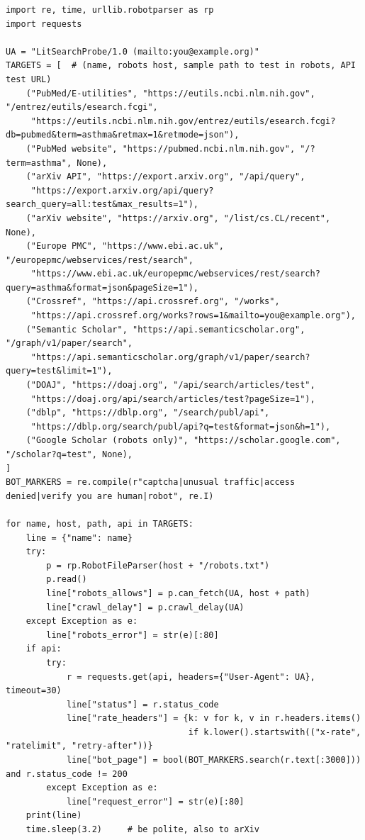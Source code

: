 \documentclass[11pt,a4paper]{article}
\begin{document}
\begin{lstlisting}[caption={probe\_access.py: проверка robots.txt и один безопасный запрос к каждому API}]
import re, time, urllib.robotparser as rp
import requests

UA = "LitSearchProbe/1.0 (mailto:you@example.org)"
TARGETS = [  # (name, robots host, sample path to test in robots, API test URL)
    ("PubMed/E-utilities", "https://eutils.ncbi.nlm.nih.gov", "/entrez/eutils/esearch.fcgi",
     "https://eutils.ncbi.nlm.nih.gov/entrez/eutils/esearch.fcgi?db=pubmed&term=asthma&retmax=1&retmode=json"),
    ("PubMed website", "https://pubmed.ncbi.nlm.nih.gov", "/?term=asthma", None),
    ("arXiv API", "https://export.arxiv.org", "/api/query",
     "https://export.arxiv.org/api/query?search_query=all:test&max_results=1"),
    ("arXiv website", "https://arxiv.org", "/list/cs.CL/recent", None),
    ("Europe PMC", "https://www.ebi.ac.uk", "/europepmc/webservices/rest/search",
     "https://www.ebi.ac.uk/europepmc/webservices/rest/search?query=asthma&format=json&pageSize=1"),
    ("Crossref", "https://api.crossref.org", "/works",
     "https://api.crossref.org/works?rows=1&mailto=you@example.org"),
    ("Semantic Scholar", "https://api.semanticscholar.org", "/graph/v1/paper/search",
     "https://api.semanticscholar.org/graph/v1/paper/search?query=test&limit=1"),
    ("DOAJ", "https://doaj.org", "/api/search/articles/test",
     "https://doaj.org/api/search/articles/test?pageSize=1"),
    ("dblp", "https://dblp.org", "/search/publ/api",
     "https://dblp.org/search/publ/api?q=test&format=json&h=1"),
    ("Google Scholar (robots only)", "https://scholar.google.com", "/scholar?q=test", None),
]
BOT_MARKERS = re.compile(r"captcha|unusual traffic|access denied|verify you are human|robot", re.I)

for name, host, path, api in TARGETS:
    line = {"name": name}
    try:
        p = rp.RobotFileParser(host + "/robots.txt")
        p.read()
        line["robots_allows"] = p.can_fetch(UA, host + path)
        line["crawl_delay"] = p.crawl_delay(UA)
    except Exception as e:
        line["robots_error"] = str(e)[:80]
    if api:
        try:
            r = requests.get(api, headers={"User-Agent": UA}, timeout=30)
            line["status"] = r.status_code
            line["rate_headers"] = {k: v for k, v in r.headers.items()
                                    if k.lower().startswith(("x-rate", "ratelimit", "retry-after"))}
            line["bot_page"] = bool(BOT_MARKERS.search(r.text[:3000])) and r.status_code != 200
        except Exception as e:
            line["request_error"] = str(e)[:80]
    print(line)
    time.sleep(3.2)     # be polite, also to arXiv
\end{lstlisting}
\end{document}
